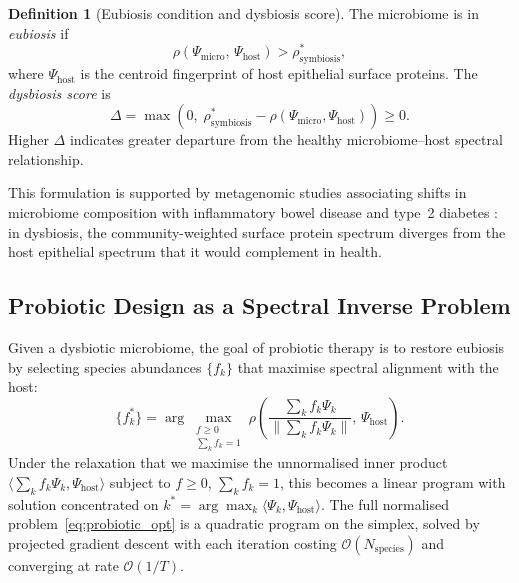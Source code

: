 \documentclass[twocolumn,11pt,a4paper]{article}
\theoremstyle{definition}
\newtheorem{definition}[theorem]{Definition}
\theoremstyle{remark}
\newcommand{\bigO}{\mathcal{O}}
\begin{document}
\begin{definition}[Eubiosis condition and dysbiosis score]
\label{def:eubiosis}
The microbiome is in \emph{eubiosis} if
\begin{equation}
  \rho(\Psi_{\text{micro}},\, \Psi_{\text{host}}) > \rho^*_{\text{symbiosis}},
\end{equation}
where $\Psi_{\text{host}}$ is the centroid fingerprint of host epithelial
surface proteins. The \emph{dysbiosis score} is
\begin{equation}
  \Delta = \max\!\left(0,\; \rho^*_{\text{symbiosis}} - \rho(\Psi_{\text{micro}},
    \Psi_{\text{host}})\right) \geq 0.
  \label{eq:dysbiosis}
\end{equation}
Higher $\Delta$ indicates greater departure from the healthy
microbiome--host spectral relationship.
\end{definition}

This formulation is supported by metagenomic studies associating shifts in
microbiome composition with inflammatory bowel disease and type~2 diabetes
\citep{qin2012, turnbaugh2006}: in dysbiosis, the community-weighted surface
protein spectrum diverges from the host epithelial spectrum that it would
complement in health.

\subsection{Probiotic Design as a Spectral Inverse Problem}

Given a dysbiotic microbiome, the goal of probiotic therapy is to restore
eubiosis by selecting species abundances $\{f_k\}$ that maximise spectral
alignment with the host:
\begin{equation}
  \{f_k^*\} = \arg\max_{\substack{f \geq 0 \\ \sum_k f_k = 1}}
    \rho\!\left(\frac{\sum_k f_k \Psi_k}{\|\sum_k f_k \Psi_k\|},\, \Psi_{\text{host}}\right).
  \label{eq:probiotic_opt}
\end{equation}
Under the relaxation that we maximise the unnormalised inner product
$\langle \sum_k f_k \Psi_k, \Psi_{\text{host}} \rangle$ subject to $f \geq 0$,
$\sum_k f_k = 1$, this becomes a linear program with solution concentrated on
$k^* = \arg\max_k \langle \Psi_k, \Psi_{\text{host}} \rangle$. The full
normalised problem~\eqref{eq:probiotic_opt} is a quadratic program on the
simplex, solved by projected gradient descent with each iteration costing
$\bigO(N_{\text{species}})$ and converging at rate $\bigO(1/T)$.
\end{document}
